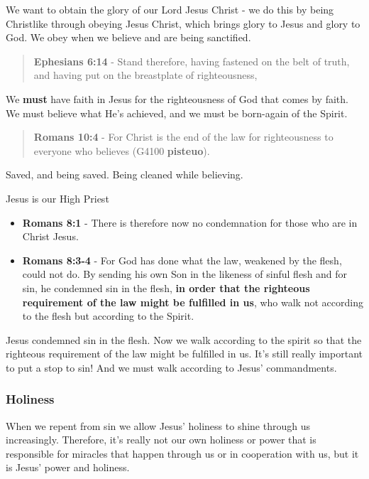 \documentclass[11pt]{article}
\begin{document}
We want to obtain the glory of our Lord Jesus Christ - we do this by being Christlike through obeying Jesus Christ, which brings glory to Jesus and glory to God. We obey when we believe and are being sanctified.

\begin{quote}
\textbf{Ephesians 6:14} - Stand therefore, having fastened on the belt of truth, and having put on the breastplate of righteousness,
\end{quote}

We \textbf{must} have faith in Jesus for the righteousness of God that comes by faith.
We must believe what He's achieved, and we must be born-again of the Spirit.

\begin{quote}
\textbf{Romans 10:4} - For Christ is the end of the law for righteousness to everyone who believes (G4100 \textbf{pisteuo}).
\end{quote}

Saved, and being saved. Being cleaned while believing.

Jesus is our High Priest
\begin{itemize}
\item \textbf{Romans 8:1} - There is therefore now no condemnation for those who are in Christ Jesus.
\item \textbf{Romans 8:3-4} - For God has done what the law, weakened by the flesh, could not do. By sending his own Son in the likeness of sinful flesh and for sin, he condemned sin in the flesh, \textbf{in order that the righteous requirement of the law might be fulfilled in us}, who walk not according to the flesh but according to the Spirit.
\end{itemize}

Jesus condemned sin in the flesh. Now we walk according to the spirit so that the righteous requirement of the law might be fulfilled in us.
It's still really important to put a stop to sin! And we must walk according to Jesus' commandments.

\subsubsection{Holiness}
\label{sec:org6aa182c}
When we repent from sin we allow Jesus' holiness to shine through us increasingly.
Therefore, it's really not our own holiness or power that is responsible for miracles that happen through us or in cooperation with us, but it is Jesus' power and holiness.
\end{document}

